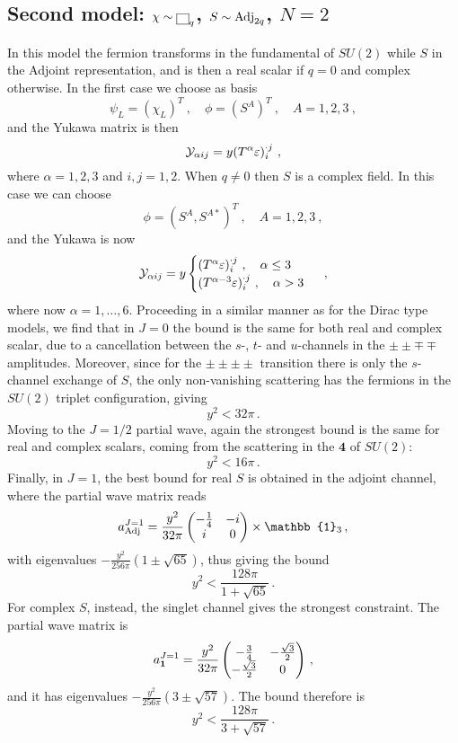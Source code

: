 \documentclass[a4paper,11pt]{article}
\newcommand{\be}{\begin{equation}}
\newcommand{\ee}{\end{equation}}
\begin{document}
\subsection{Second model: $\chi\sim {\tiny{\fbox{$\protect\phantom s$} }}_q$, $S\sim {\rm Adj}_{2q}$, $N=2$}

In this model the fermion transforms in the fundamental of $SU(2)$ while $S$ in the Adjoint representation, and is then a real scalar if $q=0$ and complex otherwise. In the first case we choose as basis
\be
\psi_L = (\chi_L)^T \ , \quad \phi = (S^A)^T \ , \quad A=1,2,3 \ ,
\ee
and the Yukawa matrix is then
\be
{\cal Y}_{\alpha i j} = y (T^\alpha\varepsilon)_{i}^{\cdot j} \ ,
\ee
where $\alpha=1,2,3$ and $i,j=1,2$.
When $q\ne 0$ then $S$ is a complex field. In this case we can choose
\be
\phi= (S^A, S^{A*})^T  \ , \quad A=1,2,3 \ ,
\ee
and the Yukawa is now
\be
{\cal Y}_{\alpha i j} =y
\begin{cases}
(T^\alpha\varepsilon)_{i}^{\cdot j} \ , \quad \alpha \le 3 \\
(T^{\alpha-3}\varepsilon)_{i}^{\cdot j} \ , \quad \alpha > 3
\end{cases} \ ,
\ee
where now $\alpha=1,\dots,6$.
Proceeding in a similar manner as for the Dirac type models, we find that in $J=0$ the bound is the same for both real and complex scalar, due to a cancellation between the $s$-, $t$- and $u$-channels in the $\pm\pm\mp\mp$ amplitudes. Moreover, since for the $\pm\pm\pm\pm$ transition there is only the $s$-channel exchange of $S$, the only non-vanishing scattering has the fermions in the $SU(2)$ triplet configuration, giving
\be
	y^2 < 32 \pi \,.
\ee
Moving to the $J=1/2$ partial wave, again the strongest bound is the same for real and complex scalars, coming from the scattering in the $\mathbf{4}$ of $SU(2)$:
\be
	y^2 < 16\pi \,.
\ee 
Finally, in $J=1$, the best bound for real $S$ is obtained in the adjoint channel, where the partial wave matrix reads
\be
	a^{J=1}_{\rm{Adj}} = \frac{y^2}{32\pi}
	\begin{pmatrix}
		-\frac{1}{4} & -i \\
		i & 0
	\end{pmatrix}
	\times \mathbb{1}_3 \,,
\ee
with eigenvalues $-\frac{y^2}{256\pi}(1\pm \sqrt{65})$, thus giving the bound 
\be
	y^2 < \frac{128 \pi}{1+\sqrt{65}} \,.
\ee
For complex $S$, instead, the singlet channel gives the strongest constraint. The partial wave matrix is
\be
	a^{J=1}_{\bf{1}} = \frac{y^2}{32\pi}
	\begin{pmatrix}
		-\frac{3}{4} & -\frac{\sqrt{3}}{2} \\
		-\frac{\sqrt{3}}{2} & 0
	\end{pmatrix}
	 \,,
\ee
and it has eigenvalues $-\frac{y^2}{256\pi}(3 \pm \sqrt{57})$. The bound therefore is
\be
	y^2 < \frac{128 \pi}{3+\sqrt{57}} \,.
\ee
\end{document}
